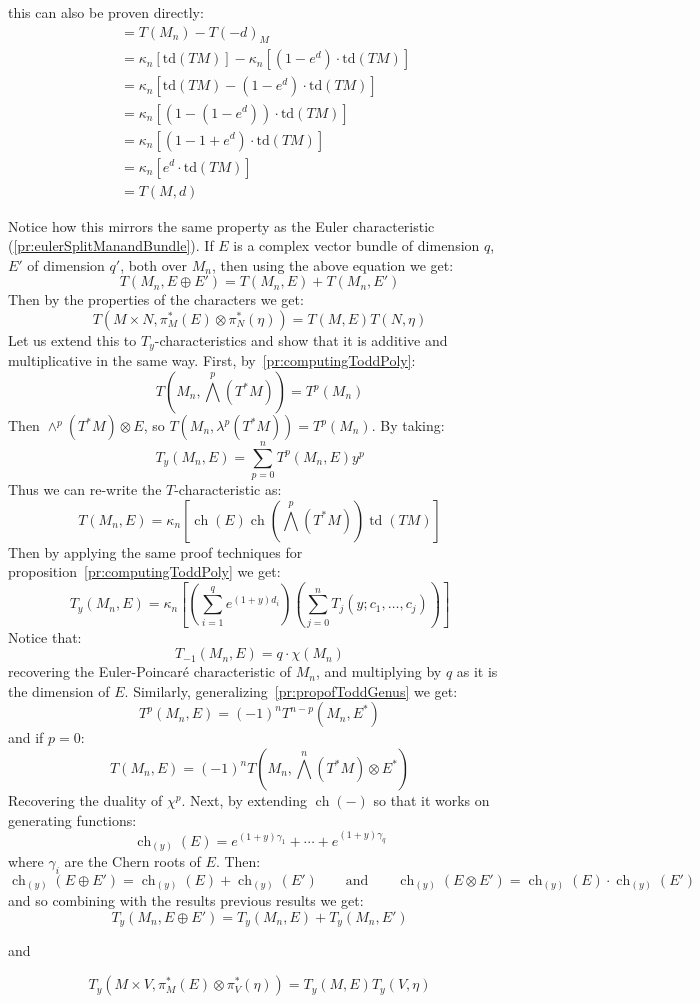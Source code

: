 \documentclass{ut-thesis}
\newenvironment{Proof}[1][]
  {\begin{ProofTcb}[#1]}
  {\end{ProofTcb}}
\newcommand{\ch}{{\operatorname{ch}}}
\newcommand{\td}{{\operatorname{td}}}
\renewcommand{\ch}{{\operatorname{ch}}}
\begin{document}
\begin{Proof}
  this can also be proven directly:
  \begin{align*} &= T(M_n) - T(-d)_M \\ &= \kappa_n[\text{td}(TM)] - \kappa_n[(1 - e^d) \cdot \text{td}(TM)] \\
  &= \kappa_n[\text{td}(TM) - (1 - e^d) \cdot \text{td}(TM)] \\ &= \kappa_n[\left(1 - (1 - e^d)\right) \cdot
  \text{td}(TM)] \\ &= \kappa_n[\left(1 - 1 + e^d\right) \cdot \text{td}(TM)] \\ &= \kappa_n[e^d \cdot
  \text{td}(TM)]\\
  &= T(M, d)
  \end{align*}
\end{Proof}
Notice how this mirrors the same property as the Euler characteristic (\cref{pr:eulerSplitManandBundle}). If $E$ is a complex
vector bundle of dimension $q$, $E'$ of dimension $q'$, both over $M_n$, then using the
above equation we get:
\[
  T(M_n, E\oplus E') = T(M_n, E) + T(M_n, E')
\]
Then by the properties of the characters we get:
\[
  T(M\times N, \pi_M^*(E)\otimes \pi_N^*(\eta)) = T(M,E)T(N, \eta)
\]
Let us extend this to $T_y$-characteristics and show that it is additive and multiplicative in the same way.
First, by~\cref{pr:computingToddPoly}:
\[
  T \left(M_n, \bigwedge^p(T^*M)\right) = T^p(M_n)
\]
Then $\wedge^p(T^*M)\otimes E$, so $T(M_n, \lambda^p(T^*M)) = T^p(M_n)$. By taking:
\[
  T_y(M_n, E) = \sum_{p=0}^n T^p(M_n, E)y^p
\]
Thus we can re-write the $T$-characteristic as:
 \[
   T(M_n,E) = \kappa_n \left[\ch(E)\ch\left(\bigwedge^p(T^*M)\right) \td(TM)\right]
 \]
 Then by applying the same proof techniques for proposition~\cref{pr:computingToddPoly} we get:
\[
  T_y(M_n, E) = \kappa_n \left[\left(\sum_{i=1}^q e^{(1+y)d_i}\right)\left(\sum_{j=0}^n T_j(y;c_1,\ldots,c_j)\right)\right]
\]
Notice that:
\[
  T_{-1}(M_n, E) = q\cdot\chi(M_n)
\]
recovering the Euler-Poincar\'e characteristic of $M_n$, and multiplying by $q$ as it is the dimension of $E$.
Similarly, generalizing~\cref{pr:propofToddGenus} we get:
\[
  T^p(M_n, E) = (-1)^n T^{n-p}(M_n, E^*)
\]
and if $p  =0$:
\[
  T(M_n, E) = (-1)^n T\left(M_n, \bigwedge^n(T^*M)\otimes E^*\right)
\]
Recovering the duality of $\chi^p$. Next, by extending $\ch(-)$ so that it works on generating functions:
  \[
    \ch_{(y)}(E) = e^{(1+y)\gamma_1} + \cdots + e^{(1+y)\gamma_q}
  \]
where $\gamma_i$ are the Chern roots of $E$. Then:
\[
  \ch_{(y)}(E\oplus E') = \ch_{(y)}(E) + \ch_{(y)}(E') \qquad \text{and} \qquad \ch_{(y)}(E\otimes E')
  = \ch_{(y)}(E)\cdot \ch_{(y)}(E')
\]
and so combining with the results previous results we get:
\[
  T_y(M_n, E\oplus E') = T_y(M_n, E) + T_y(M_n, E')
\]
\begin{center}
  and
\end{center}
\[
  T_y(M\times V, \pi_M^*(E)\otimes \pi_V^*(\eta)) = T_y(M, E)T_y(V, \eta)
\]
\end{document}
